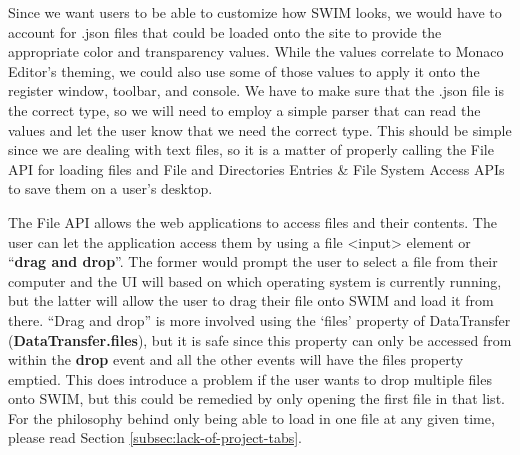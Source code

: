 \documentclass[
    paper=letter,
    parskip=half,
    fontsize=12pt,
    titlepage=firstiscover,
    toc=bibliography,
    numbers=endperiod
]{scrartcl}
\begin{document}
Since we want users to be able to customize how SWIM looks, we would
have to account for .json files that could be loaded onto the site to
provide the appropriate color and transparency values. While the values
correlate to Monaco Editor's theming, we could also use some of those
values to apply it onto the register window, toolbar, and console. We
have to make sure that the .json file is the correct type, so we will
need to employ a simple parser that can read the values and let the user
know that we need the correct type. This should be simple since we are
dealing with text files, so it is a matter of properly calling the File
API for loading files and File and Directories Entries \& File System
Access APIs to save them on a user's desktop.

The File API \cite{mdn-file-api} allows the web applications to access files and their
contents. The user can let the application access them by using a file
\textless input\textgreater{} element or ``\textbf{drag and drop}''. The
former would prompt the user to select a file from their computer and
the UI will based on which operating system is currently running, but
the latter will allow the user to drag their file onto SWIM and load it
from there. ``Drag and drop'' is more involved using the `files'
property of DataTransfer (\textbf{DataTransfer.files}), but it is safe
since this property can only be accessed from within the \textbf{drop}
event and all the other events will have the files property emptied.
This does introduce a problem if the user wants to drop multiple files
onto SWIM, but this could be remedied by only opening the first file in
that list. For the philosophy behind only being able to load in one file
at any given time, please read Section \ref{subsec:lack-of-project-tabs}.
\end{document}

